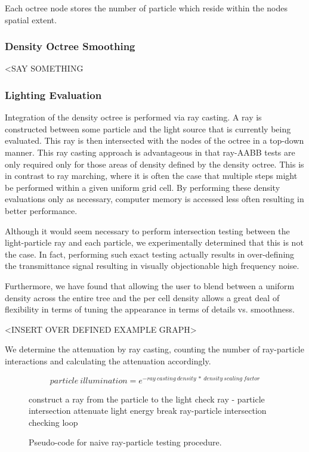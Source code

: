 \documentclass{article}
\begin{document}
Each octree node stores the number of particle which reside within the nodes spatial extent.

\subsubsection{Density Octree Smoothing}

<SAY SOMETHING

\subsubsection{Lighting Evaluation}

Integration of the density octree is performed via ray casting. A ray is constructed between some particle and the light source that is currently being evaluated. This ray is then intersected with the nodes of the octree in a top-down manner. This ray casting approach is advantageous in that ray-AABB tests are only required only for those areas of density defined by the density octree. This is in contrast to ray marching, where it is often the case that multiple steps might be performed within a given uniform grid cell. By performing these density evaluations only as necessary, computer memory is accessed less often resulting in better performance. 

Although it would seem necessary to perform intersection testing between the light-particle ray and each particle, we experimentally determined that this is not the case. In fact, performing such exact testing actually results in over-defining the transmittance signal resulting in visually objectionable high frequency noise.

Furthermore, we have found that allowing the user to blend between a uniform density across the entire tree and the per cell density allows a great deal of flexibility in terms of tuning the appearance in terms of details vs. smoothness.

<INSERT OVER DEFINED EXAMPLE GRAPH>

We determine the attenuation by ray casting, counting the number of ray-particle interactions and calculating the attenuation accordingly.

\begin{equation}
particle\:illumination = e^{-ray\:casting\:density\:*\:density\:scaling\:factor}
\end{equation}

\begin{figure}[h!]
	\centering

\begin{algorithmic}
	\STATE construct a ray from the particle to the light
		\STATE check ray - particle intersection
        			\STATE attenuate light energy
		\ENDIF
        			\STATE break ray-particle intersection checking loop
		\ENDIF
	\ENDFOR
\ENDFOR
\end{algorithmic}

	\caption{Pseudo-code for naive ray-particle testing procedure.}
\end{figure}
\end{document}

